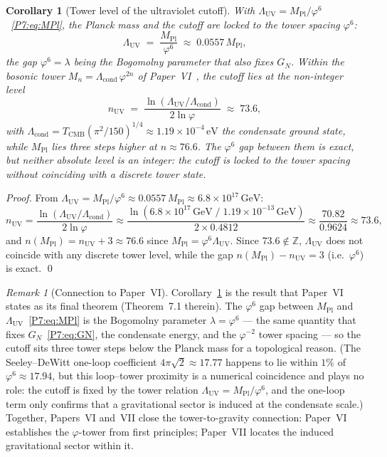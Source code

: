 \documentclass[11pt,a4paper]{article}
\newtheorem{corollary}[theorem]{Corollary}
\theoremstyle{definition}
\theoremstyle{remark}
\newtheorem{remark}[theorem]{Remark}
\newcommand{\vp}{\varphi}
\newcommand{\TCMB}{T_{\mathrm{CMB}}}
\newcommand{\Lcond}{\Lambda_{\mathrm{cond}}}
\newcommand{\MPl}{M_{\mathrm{Pl}}}
\newcommand{\LUV}{\Lambda_{\mathrm{UV}}}
\begin{document}
\begin{corollary}[Tower level of the ultraviolet cutoff]
\label{P7:cor:luv_tower}
With $\LUV=\MPl/\vp^6$~\eqref{P7:eq:MPl}, the Planck mass and the cutoff are
locked to the tower spacing $\vp^6$:
\begin{equation}
  \LUV \;=\; \frac{\MPl}{\vp^6}\;\approx\;0.0557\,\MPl,
  \label{P7:eq:LUV_from_MPl}
\end{equation}
the gap $\vp^6=\lambda$ being the Bogomolny parameter that also fixes $G_N$.
Within the bosonic tower $M_n = \Lcond\,\vp^{2n}$ of Paper~VI~\cite{Paper6},
the cutoff lies at the non-integer level
\begin{equation}
  \boxed{n_{\mathrm{UV}}
  \;=\; \frac{\ln(\LUV/\Lcond)}{2\ln\vp}
  \;\approx\; 73.6,}
  \label{P7:eq:nUV_formula}
\end{equation}
with $\Lcond = \TCMB(\pi^2/150)^{1/4}\approx1.19\times10^{-4}\,\mathrm{eV}$
the condensate ground state, while $\MPl$ lies three steps higher at
$n\approx76.6$.  The $\vp^6$ gap between them is exact, but neither absolute
level is an integer: the cutoff is locked to the tower spacing without
coinciding with a discrete tower state.
\end{corollary}

\begin{proof}
From $\LUV = \MPl/\vp^6\approx0.0557\,\MPl\approx6.8\times10^{17}\,\mathrm{GeV}$:
\begin{equation*}
  n_{\mathrm{UV}}
  = \frac{\ln(\LUV/\Lcond)}{2\ln\vp}
  \approx \frac{\ln(6.8\times10^{17}\,\mathrm{GeV}\;/\;1.19\times10^{-13}\,\mathrm{GeV})}{2\times0.4812}
  \approx \frac{70.82}{0.9624}
  \approx 73.6,
\end{equation*}
and $n(\MPl)=n_{\mathrm{UV}}+3\approx76.6$ since $\MPl=\vp^6\LUV$.
Since $73.6\notin\mathbb{Z}$, $\LUV$ does not coincide with any discrete tower
level, while the gap $n(\MPl)-n_{\mathrm{UV}}=3$ (i.e.\ $\vp^6$) is exact.
\qed
\end{proof}

\begin{remark}[Connection to Paper~VI]
\label{P7:rem:bogomolny_coincidence}
Corollary~\ref{P7:cor:luv_tower} is the result that Paper~VI~\cite{Paper6}
states as its final theorem (Theorem~7.1 therein).  The $\vp^6$ gap between
$\MPl$ and $\LUV$~\eqref{P7:eq:MPl} is the Bogomolny parameter $\lambda=\vp^6$
--- the same quantity that fixes $G_N$~\eqref{P7:eq:GN}, the condensate energy,
and the $\vp^{-2}$ tower spacing --- so the cutoff sits three tower steps below
the Planck mass for a topological reason.  (The Seeley--DeWitt one-loop
coefficient $4\pi\sqrt{2}\approx17.77$ happens to lie within $1\%$ of
$\vp^6\approx17.94$, but this loop--tower proximity is a numerical coincidence
and plays no role: the cutoff is fixed by the tower relation $\LUV=\MPl/\vp^6$,
and the one-loop term only confirms that a gravitational sector is induced at
the condensate scale.)  Together, Papers~VI and~VII close the tower-to-gravity
connection: Paper~VI establishes the $\vp$-tower from first principles;
Paper~VII locates the induced gravitational sector within it.
\end{remark}
\end{document}
